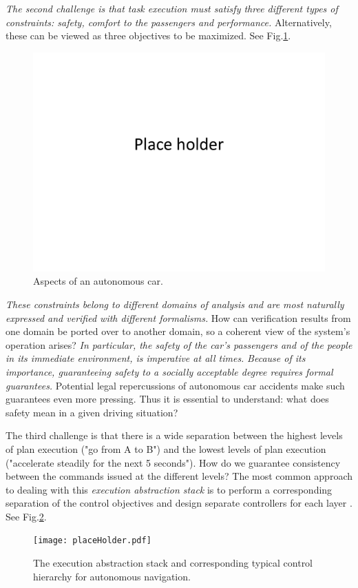 {\it The second challenge is that task execution must satisfy three different types of constraints: safety, comfort to the passengers and performance.}
Alternatively, these can be viewed as three objectives to be maximized.
See Fig.\ref{fig:aspects}.
\begin{figure}[tb]
	\centering
	\includegraphics{figures/placeHolder}
	\caption{Aspects of an autonomous car.}
	\label{fig:aspects}
\end{figure}
\emph{These constraints belong to different domains of analysis and are most naturally expressed and verified with different formalisms.}
How can verification results from one domain be ported over to another domain, so a coherent view of the system's operation arises?
{\it In particular, the safety of the car's passengers and of the people in its immediate environment, is imperative at all times.}
{\it Because of its importance, guaranteeing safety to a socially acceptable degree requires formal guarantees.}
Potential legal repercussions of autonomous car accidents make such guarantees even more pressing.
Thus it is essential to understand: what does safety mean in a given driving situation?

The third challenge is that there is a wide separation between the highest levels of plan execution ("go from A to B") and the lowest levels of plan execution ("accelerate steadily for the next 5 seconds"). 
How do we guarantee consistency between the commands issued at the different levels?
The most common approach to dealing with this \emph{execution abstraction stack} is to perform a corresponding separation of the control objectives and design separate controllers for each layer \cite{UrmsonX07_Tartan}. See Fig.\ref{fig:tartanHierarchy}.
\begin{figure}[tb]
	\label{fig:tartanHierarchy}
	\texttt{[image: placeHolder.pdf]}
	\caption{The execution abstraction stack and corresponding typical control hierarchy for autonomous navigation.}
\end{figure}

